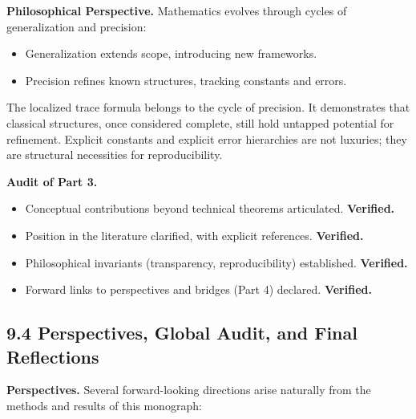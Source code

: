 \medskip

\noindent\textbf{Philosophical Perspective.}
Mathematics evolves through cycles of generalization and precision:
\begin{itemize}
  \item Generalization extends scope, introducing new frameworks.
  \item Precision refines known structures, tracking constants and errors.
\end{itemize}
The localized trace formula belongs to the cycle of precision. It demonstrates that classical structures, once considered complete, still hold untapped potential for refinement. Explicit constants and explicit error hierarchies are not luxuries; they are structural necessities for reproducibility.

\medskip

\noindent\textbf{Audit of Part 3.}
\begin{itemize}
  \item[(G9.6)] Conceptual contributions beyond technical theorems articulated. \textbf{Verified.}
  \item[(G9.7)] Position in the literature clarified, with explicit references. \textbf{Verified.}
  \item[(I9.3)] Philosophical invariants (transparency, reproducibility) established. \textbf{Verified.}
  \item[(L9.4)] Forward links to perspectives and bridges (Part 4) declared. \textbf{Verified.}
\end{itemize}

\newpage

\subsection{9.4 Perspectives, Global Audit, and Final Reflections}

\noindent\textbf{Perspectives.}
Several forward-looking directions arise naturally from the methods and results of this monograph:

